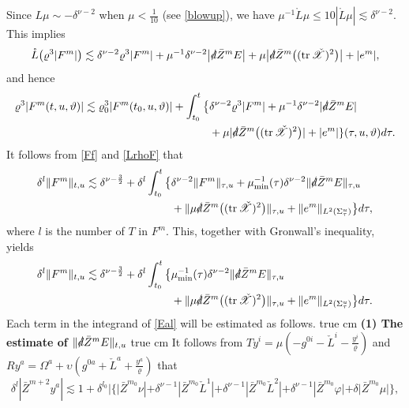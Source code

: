\documentclass[11pt,twoside]{article}
\def\vp{\varphi}
\def\f{\frac}
\begin{document}
Since $L\mu \sim -\delta^{\nu-2}$ when $\mu < \frac{1}{10}$ (see \eqref{blowup}), we have $\mu^{-1}\mathring{L}\mu
\leq 10|\mathring{L}\mu| \lesssim \delta^{\nu-2}$. This implies
\[
\mathring{L}\bigl(\varrho^3|F^m|\bigr) \lesssim \delta^{\nu-2}\varrho^3|F^m|
+ \mu^{-1}\delta^{\nu-2}\bigl|\slashed{d}\bar{Z}^m E\bigr|
+ \mu\bigl|\slashed{d}\bar{Z}^m\bigl((\operatorname{tr}\check{\mathscr{X}})^2\bigr)\bigr|
+ |e^m|,
\]
and hence
\begin{equation}\label{LrhoF}
\begin{split}
\varrho^3|F^m(t,u,\vartheta)|\lesssim\varrho_0^3|F^m(t_0,u,\vartheta)|+\int_{t_0}^t\big\{&\delta^{\nu-2}\varrho^3|F^m|+ \mu^{-1}\delta^{\nu-2}|\slashed{d}\bar{Z}^m E| \\
&+ \mu|\slashed{d}\bar{Z}^m\big((\operatorname{tr}\check{\mathscr{X}})^2\big)|
+ |e^m|\}(\tau,u,\vartheta)d\tau.
\end{split}
\end{equation}
It follows from \eqref{Ff} and \eqref{LrhoF} that
\begin{equation*}
\begin{split}
\delta^l\|F^m\|_{t,u}\lesssim\delta^{\nu-\f32}+\delta^l\int_{t_0}^t\big\{&\delta^{\nu-2}\|F^m\|_{\tau,u}+\mu_{\min}^{-1}(\tau)\delta^{\nu-2}\|\slashed d\bar Z^m E\|_{\tau,u}\\
&+\|\mu\slashed d\bar Z^m\bigl((\operatorname{tr}\check{\mathscr{X}})^2\bigr)\|_{\tau,u}+\| e^m\|_{L^2(\Sigma_{\tau}^u)}\big\}d\tau,
\end{split}
\end{equation*}
where $l$ is the number of $T$ in $F^m$. This, together with Gronwall's inequality, yields
\begin{equation}\label{Eal}
\begin{split}
\delta^l\|F^m\|_{t,u}\lesssim\delta^{\nu-\f32}+\delta^l\int_{t_0}^t\big\{&\mu_{\min}^{-1}(\tau)\delta^{\nu-2}\|\slashed d\bar Z^m E\|_{\tau,u}\\
&+\|\mu\slashed d\bar Z^m\bigl((\operatorname{tr}\check{\mathscr{X}})^2\big)\|_{\tau,u}+\| e^m\|_{L^2(\Sigma_{\tau}^u)}\big\}d\tau.
\end{split}
\end{equation}
Each term in the integrand of \eqref{Eal} will be estimated as follows.
 true cm
{\bfseries (1) The estimate of $\|\slashed d\bar Z^m E\|_{t,u}$}
 true cm
It follows from $Ty^i=\mu(-g^{0i}-\check L^i-\f{y^i}\varrho)$ and $Ry^a=\Omega^a+\upsilon(g^{0a}+\check L^a+\f{y^a}\varrho)$ that
\[
\delta^l|\bar Z^{m+2}y^a|\lesssim1+\delta^{l_0}|\big\{|\bar Z^{m_0}\nu|+\delta^{\nu-1}|\bar Z^{m_0}\check L^1|+\delta^{\nu-1}|\bar Z^{m_0}\check L^2|+\delta^{\nu-1}|\bar Z^{m_0}\vp|+\delta|\bar Z^{m_0}\mu|\big\},
\]
\end{document}
